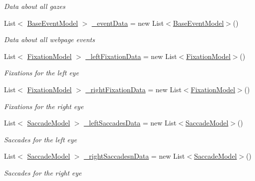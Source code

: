 \begin{DoxyCompactItemize}
\begin{DoxyCompactList}\small\item\em Data about all gazes \end{DoxyCompactList}\item 
List$<$ \hyperlink{class_web_analyzer_1_1_models_1_1_event_model_1_1_base_event_model}{Base\+Event\+Model} $>$ \hyperlink{class_web_analyzer_1_1_models_1_1_data_model_1_1_webpage_model_a6f183590ba34744b4cec4c8cfb126af5}{\+\_\+event\+Data} = new List$<$\hyperlink{class_web_analyzer_1_1_models_1_1_event_model_1_1_base_event_model}{Base\+Event\+Model}$>$()
\begin{DoxyCompactList}\small\item\em Data about all webpage events \end{DoxyCompactList}\item 
List$<$ \hyperlink{class_web_analyzer_1_1_models_1_1_analysis_model_1_1_fixation_model}{Fixation\+Model} $>$ \hyperlink{class_web_analyzer_1_1_models_1_1_data_model_1_1_webpage_model_aeef627527c26ccf4d8caa6e65101970f}{\+\_\+left\+Fixation\+Data} = new List$<$\hyperlink{class_web_analyzer_1_1_models_1_1_analysis_model_1_1_fixation_model}{Fixation\+Model}$>$()
\begin{DoxyCompactList}\small\item\em Fixations for the left eye \end{DoxyCompactList}\item 
List$<$ \hyperlink{class_web_analyzer_1_1_models_1_1_analysis_model_1_1_fixation_model}{Fixation\+Model} $>$ \hyperlink{class_web_analyzer_1_1_models_1_1_data_model_1_1_webpage_model_a5c341d7a7fd5074ddbd4cb7622914465}{\+\_\+right\+Fixation\+Data} = new List$<$\hyperlink{class_web_analyzer_1_1_models_1_1_analysis_model_1_1_fixation_model}{Fixation\+Model}$>$()
\begin{DoxyCompactList}\small\item\em Fixations for the right eye \end{DoxyCompactList}\item 
List$<$ \hyperlink{class_web_analyzer_1_1_models_1_1_analysis_model_1_1_saccade_model}{Saccade\+Model} $>$ \hyperlink{class_web_analyzer_1_1_models_1_1_data_model_1_1_webpage_model_ae5f64734db7ab52273fa0cd24ca0a31a}{\+\_\+left\+Saccades\+Data} = new List$<$\hyperlink{class_web_analyzer_1_1_models_1_1_analysis_model_1_1_saccade_model}{Saccade\+Model}$>$()
\begin{DoxyCompactList}\small\item\em Saccades for the left eye \end{DoxyCompactList}\item 
List$<$ \hyperlink{class_web_analyzer_1_1_models_1_1_analysis_model_1_1_saccade_model}{Saccade\+Model} $>$ \hyperlink{class_web_analyzer_1_1_models_1_1_data_model_1_1_webpage_model_aa2ee1cf77db6f7e7f68fbf8c971109cf}{\+\_\+right\+Saccadesn\+Data} = new List$<$\hyperlink{class_web_analyzer_1_1_models_1_1_analysis_model_1_1_saccade_model}{Saccade\+Model}$>$()
\begin{DoxyCompactList}\small\item\em Saccades for the right eye \end{DoxyCompactList}\end{DoxyCompactItemize}


